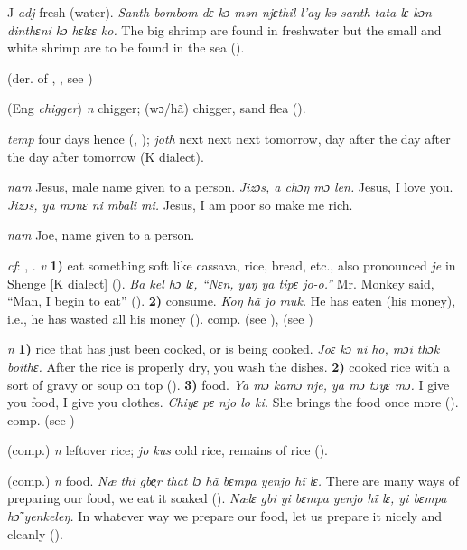 \begin{letter}{J}
 \textit{adj} fresh (water). \textit{Santh bombom dɛ kɔ mən njɛthil l'ay kə santh tata lɛ kɔn dinthɛni kɔ hɛlɛɛ ko.} The big shrimp are found in freshwater but the small and white shrimp are to be found in the sea (\citealt{Pichl1967}). 

 (der. of , , see ) 

 (Eng \textit{chigger}) \textit{n} chigger; (wɔ/hã) chigger, sand flea (\citealt{Pichl1967}). 

 \textit{temp} four days hence (\citealt{Pichl1967}, \citealt{Sumner1921}); \textit{joth} next next next tomorrow, day after the day after the day after tomorrow (K dialect). 

 \textit{nam} Jesus, male name given to a person. \textit{Jizɔs, a chɔŋ mɔ len.} Jesus, I love you. \textit{Jizɔs, ya mɔnɛ ni mbali mi.} Jesus, I am poor so make me rich.

 \textit{nam} Joe, name given to a person.

 \textit{cf}: , . \textit{v} \textbf{1)} eat something soft like cassava, rice, bread, etc., also pronounced \textit{je} in Shenge [K dialect] (\citealt{Pichl1967}). \textit{Ba kel hɔ lɛ, “Nɛn, yaŋ ya tipɛ jo-o.”} Mr. Monkey said, “Man, I begin to eat” (\citealt{Pichl1967}). \textbf{2)} consume. \textit{Koŋ hã jo muk.} He has eaten (his money), i.e., he has wasted all his money (\citealt{Pichl1967}). comp.  (see ),  (see ) 

 \textit{n} \textbf{1)} rice that has just been cooked, or is being cooked. \textit{Joɛ kɔ ni ho, mɔi thɔk boithɛ.} After the rice is properly dry, you wash the dishes. \textbf{2)} cooked rice with a sort of gravy or soup on top (\citealt{Pichl1967}). \textbf{ 3)} food. \textit{Ya mɔ kamɔ nje, ya mɔ tɔyɛ mɔ.} I give you food, I give you clothes. \textit{Chiyɛ pɛ njo lo ki.} She brings the food once more (\citealt{Pichl1967}). comp.  (see ) 

 (comp.) \textit{n} leftover rice; \textit{jo kus} cold rice, remains of rice (\citealt{Pichl1967}). 

 (comp.) \textit{n} food. \textit{Næ thi gbe̹r that lɔ hã bɛmpa yenjo hĩ lɛ.} There are many ways of preparing our food, we eat it soaked (\citealt{Pichl1967}). \textit{Nælɛ gbi yi bɛmpa yenjo hĩ lɛ, yi bɛmpa hɔ̃ yenkeleŋ.} In whatever way we prepare our food, let us prepare it nicely and cleanly (\citealt{Pichl1967}). 


\end{letter}

